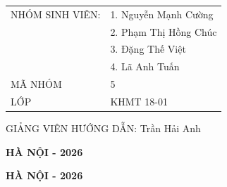 \documentclass[11pt,a4paper]{article}
\begin{document}
\begin{titlepage}
  \thispagestyle{empty}\KhungBiaGoodreads\centering
  \TieuDeBiaGoodreads
  \vfill
  {\bfseries\fontsize{12}{18}\selectfont
    \renewcommand{\arraystretch}{1.15}
    \begin{tabular}{@{}p{45mm}l@{}}
      NHÓM SINH VIÊN: & 1. Nguyễn Mạnh Cường\\
                       & 2. Phạm Thị Hồng Chúc\\
                       & 3. Đặng Thế Việt\\
                       & 4. Lã Anh Tuấn\\[4mm]
      MÃ NHÓM & 5\\
      LỚP & KHMT 18-01
    \end{tabular}\par
    \vspace{5mm}
    GIẢNG VIÊN HƯỚNG DẪN: Trần Hải Anh\par}
  \vfill
  {\bfseries\fontsize{13}{16}\selectfont HÀ NỘI - 2026\par}
  \vspace*{6mm}
\end{titlepage}

\begin{titlepage}
  \thispagestyle{empty}\KhungBiaGoodreads\centering
  \TieuDeBiaGoodreads
  \vfill
  {\bfseries\fontsize{12}{18}\selectfont
    \renewcommand{\arraystretch}{1.15}
    \ThanhVienGoodreads\par}
  \vfill
  {\bfseries\fontsize{13}{16}\selectfont HÀ NỘI - 2026\par}
  \vspace*{6mm}
\end{titlepage}
\end{document}
